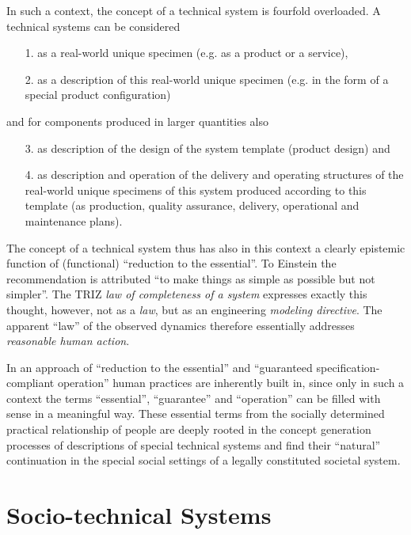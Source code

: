 \documentclass[11pt,a4paper]{article}
\begin{document}
In such a context, the concept of a technical system is fourfold overloaded.
A technical systems can be considered
\begin{itemize}
\item [1.] as a real-world unique specimen (e.g. as a product or a service),
\item [2.] as a description of this real-world unique specimen (e.g. in the
  form of a special product configuration)
\end{itemize}
and for components produced in larger quantities also
\newpage
\begin{itemize}
\item [3.] as description of the design of the system template (product
  design) and
\item [4.] as description and operation of the delivery and operating
  structures of the real-world unique specimens of this system produced
  according to this template (as production, quality assurance, delivery,
  operational and maintenance plans).
\end{itemize}
The concept of a technical system thus has also in this context a clearly
epistemic function of (functional) ``reduction to the essential''. To Einstein
the recommendation is attributed ``to make things as simple as possible but
not simpler''. The TRIZ \emph{law of completeness of a system} expresses
exactly this thought, however, not as a \emph{law}, but as an engineering
\emph{modeling directive}. The apparent ``law'' of the observed dynamics
therefore essentially addresses \emph{reasonable human action}.

In an approach of ``reduction to the essential'' and ``guaranteed
specification-compliant operation'' human practices are inherently built in,
since only in such a context the terms ``essential'', ``guarantee'' and
``operation'' can be filled with sense in a meaningful way. These essential
terms from the socially determined practical relationship of people are deeply
rooted in the concept generation processes of descriptions of special
technical systems and find their ``natural'' continuation in the special
social settings of a legally constituted societal system.

\section{Socio-technical Systems}
\end{document}
